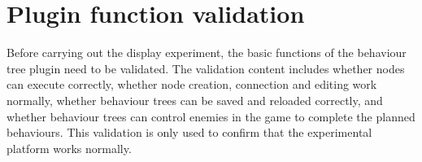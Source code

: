 \section{Plugin function validation}

Before carrying out the display experiment, the basic functions of the behaviour tree plugin need to be validated. The validation content includes whether nodes can execute correctly, whether node creation, connection and editing work normally, whether behaviour trees can be saved and reloaded correctly, and whether behaviour trees can control enemies in the game to complete the planned behaviours. This validation is only used to confirm that the experimental platform works normally.
